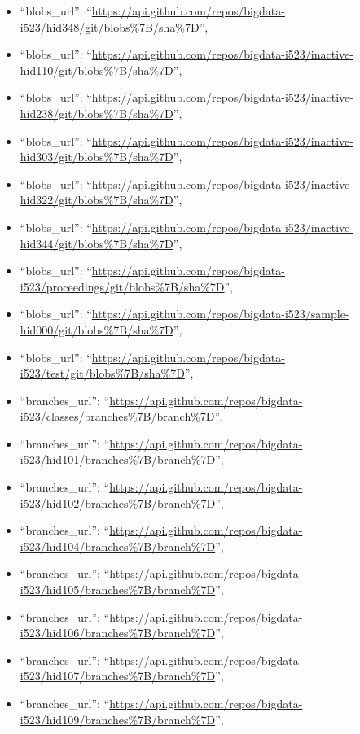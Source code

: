\begin{itemize}
\item
  ``blobs\_url'':
  ``\url{https://api.github.com/repos/bigdata-i523/hid348/git/blobs\%7B/sha\%7D}'',
\item
  ``blobs\_url'':
  ``\url{https://api.github.com/repos/bigdata-i523/inactive-hid110/git/blobs\%7B/sha\%7D}'',
\item
  ``blobs\_url'':
  ``\url{https://api.github.com/repos/bigdata-i523/inactive-hid238/git/blobs\%7B/sha\%7D}'',
\item
  ``blobs\_url'':
  ``\url{https://api.github.com/repos/bigdata-i523/inactive-hid303/git/blobs\%7B/sha\%7D}'',
\item
  ``blobs\_url'':
  ``\url{https://api.github.com/repos/bigdata-i523/inactive-hid322/git/blobs\%7B/sha\%7D}'',
\item
  ``blobs\_url'':
  ``\url{https://api.github.com/repos/bigdata-i523/inactive-hid344/git/blobs\%7B/sha\%7D}'',
\item
  ``blobs\_url'':
  ``\url{https://api.github.com/repos/bigdata-i523/proceedings/git/blobs\%7B/sha\%7D}'',
\item
  ``blobs\_url'':
  ``\url{https://api.github.com/repos/bigdata-i523/sample-hid000/git/blobs\%7B/sha\%7D}'',
\item
  ``blobs\_url'':
  ``\url{https://api.github.com/repos/bigdata-i523/test/git/blobs\%7B/sha\%7D}'',
\item
  ``branches\_url'':
  ``\url{https://api.github.com/repos/bigdata-i523/classes/branches\%7B/branch\%7D}'',
\item
  ``branches\_url'':
  ``\url{https://api.github.com/repos/bigdata-i523/hid101/branches\%7B/branch\%7D}'',
\item
  ``branches\_url'':
  ``\url{https://api.github.com/repos/bigdata-i523/hid102/branches\%7B/branch\%7D}'',
\item
  ``branches\_url'':
  ``\url{https://api.github.com/repos/bigdata-i523/hid104/branches\%7B/branch\%7D}'',
\item
  ``branches\_url'':
  ``\url{https://api.github.com/repos/bigdata-i523/hid105/branches\%7B/branch\%7D}'',
\item
  ``branches\_url'':
  ``\url{https://api.github.com/repos/bigdata-i523/hid106/branches\%7B/branch\%7D}'',
\item
  ``branches\_url'':
  ``\url{https://api.github.com/repos/bigdata-i523/hid107/branches\%7B/branch\%7D}'',
\item
  ``branches\_url'':
  ``\url{https://api.github.com/repos/bigdata-i523/hid109/branches\%7B/branch\%7D}'',

\end{itemize}
